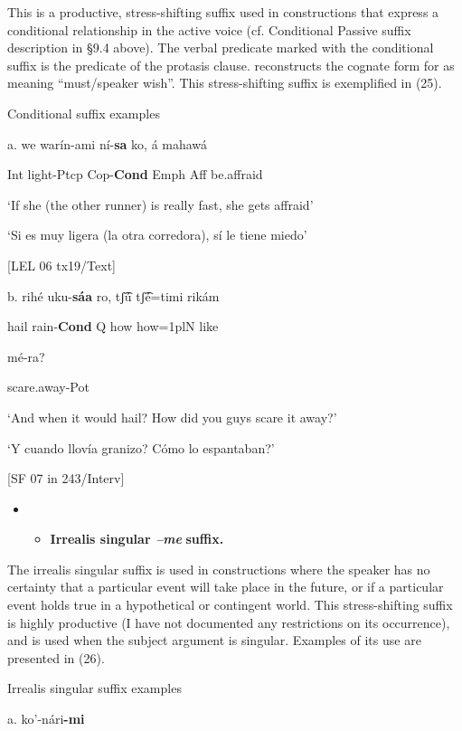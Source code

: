 This is a productive, stress-shifting suffix used in constructions that express a conditional relationship in the active voice (cf. Conditional Passive suffix description in §9.4 above). The verbal predicate marked with the conditional suffix is the predicate of the protasis clause. \citet[216]{steele1975protoUA} reconstructs the cognate form for  as meaning “must/speaker wish”. This stress-shifting suffix is exemplified in (25).

  Conditional suffix examples

a.   we   warín-ami   ní-\textbf{sa}     ko,   á   mahawá

Int   light-Ptcp   Cop-\textbf{Cond}   Emph   Aff   be.affraid

‘If she (the other runner) is really fast, she gets affraid’

‘Si es muy ligera (la otra corredora), sí le tiene miedo’  

                [LEL 06 tx19/Text]

b.  rihé   uku-\textbf{sáa}   ro,   tʃ͡ú   tʃ͡é=timi   rikám    

hail  rain-\textbf{Cond} Q  how  how=1plN  like  

mé-ra?     

scare.away-Pot  

‘And when it would hail? How did you guys scare it away?’

‘Y cuando llovía granizo? Cómo lo espantaban?’  

[SF 07 in 243/Interv]  

\begin{itemize}
\item \begin{itemize}
\item \textbf{Irrealis singular \textit{–me} }\textbf{suffix.}
\end{itemize}
\end{itemize}

The irrealis singular suffix is used in constructions where the speaker has no certainty that a particular event will take place in the future, or if a particular event holds true in a hypothetical or contingent world. This stress-shifting suffix is highly productive (I have not documented any restrictions on its occurrence), and is used when the subject argument is singular. Examples of its use are presented in (26).

   Irrealis singular suffix examples

a.  ko’-nári\textbf{{}-mi}     

